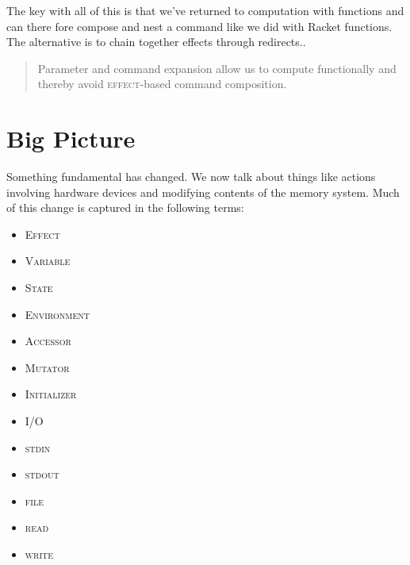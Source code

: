 \documentclass[]{tufte-handout}
\begin{document}
The key with all of this is that we've returned to computation with functions and can there fore compose and nest a command like we did with Racket functions. The alternative is to chain together effects through redirects..
\begin{quote}
Parameter and command expansion allow us to compute functionally and thereby avoid \textsc{effect}-based command composition.
\end{quote}

\section{Big Picture}

Something fundamental has changed. We now talk about things like actions involving hardware devices and modifying contents of the memory system. Much of this change is captured in the following terms: 
\begin{itemize}
\item \textsc{Effect}
\item \textsc{Variable}
\item \textsc{State}
\item \textsc{Environment}
\item \textsc{Accessor}
\item \textsc{Mutator}
\item \textsc{Initializer}
\item \textsc{I/O}
\item \textsc{stdin}
\item \textsc{stdout}
\item \textsc{file}
\item \textsc{read}
\item \textsc{write}
\end{itemize}
\end{document}
